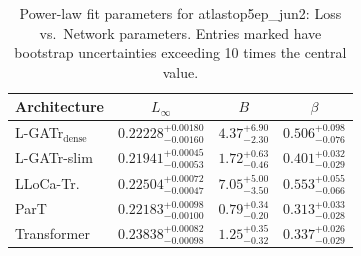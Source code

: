 \begin{table}[h]
  \centering
  \begin{tabular}{lccc}
    \toprule
    Architecture & $L_\infty$ & $B$ & $\beta$ \\
    \midrule
    L-GATr$_\mathrm{dense}$ & $0.22228^{+0.00180}_{-0.00160}$ & $4.37^{+6.90}_{-2.30}$ & $0.506^{+0.098}_{-0.076}$ \\
    L-GATr-slim & $0.21941^{+0.00045}_{-0.00053}$ & $1.72^{+0.63}_{-0.46}$ & $0.401^{+0.032}_{-0.029}$ \\
    LLoCa-Tr. & $0.22504^{+0.00072}_{-0.00047}$ & $7.05^{+5.00}_{-3.50}$ & $0.553^{+0.055}_{-0.066}$ \\
    ParT & $0.22183^{+0.00098}_{-0.00100}$ & $0.79^{+0.34}_{-0.20}$ & $0.313^{+0.033}_{-0.028}$ \\
    Transformer & $0.23838^{+0.00082}_{-0.00098}$ & $1.25^{+0.35}_{-0.32}$ & $0.337^{+0.026}_{-0.029}$ \\
    \bottomrule
  \end{tabular}
  \caption{Power-law fit parameters for atlastop5ep\_jun2: Loss vs.\ Network parameters. Entries marked \textemdash{} have bootstrap uncertainties exceeding 10 times the central value.}
  \label{tab:atlastop5ep_jun2}
\end{table}
